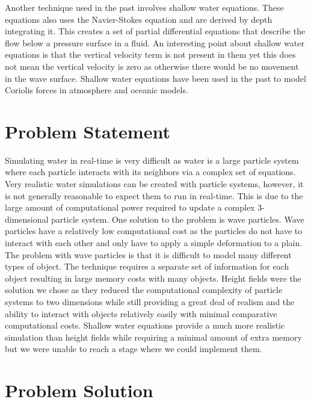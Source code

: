 \documentclass[12pt,notitlepage]{article}
\begin{document}
Another technique used in the past involves shallow water equations. These 
equations also uses the Navier-Stokes equation and are derived by depth 
integrating it. This creates a set of partial differential equations that 
describe the flow below a pressure surface in a fluid.  An interesting point 
about shallow water equations is that the vertical velocity term is not present 
in them yet this does not mean the vertical velocity is zero as otherwise there 
would be no movement in the wave surface. Shallow water equations have been 
used in the past to model Coriolis forces in atmosphere and oceanic models. 
\cite{shalloweq}


\section{Problem Statement}

Simulating water in real-time is very difficult as water is a large particle system where each particle interacts with its neighbors via a complex set of equations.  Very realistic water simulations can be created with particle systems, however, it is not generally reasonable to expect them to run in real-time.  This is due to the large amount of computational power required to update a complex 3-dimensional particle system.  One solution to the problem is wave particles.  Wave particles have a relatively low computational cost as the particles do not have to interact with each other and only have to apply a simple deformation to a plain.  The problem with wave particles is that it is difficult to model many different types of object.  The technique requires a separate set of information for each object resulting in large memory costs with many objects.  Height fields were the solution we chose as they reduced the computational complexity of particle systems to two dimensions while still providing a great deal of realism and the ability to interact with objects relatively easily with minimal comparative computational costs.  Shallow water equations provide a much more realistic simulation than height fields while requiring a minimal amount of extra memory but we were unable to reach a stage where we could implement them.
 
\section{Problem Solution}
\end{document}
